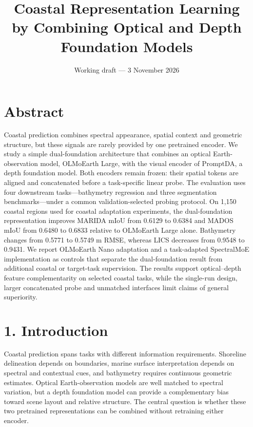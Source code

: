 \documentclass[
  10pt,
  english,
]{article}
\title{Coastal Representation Learning by Combining Optical and Depth
Foundation Models}
\author{}
\date{Working draft --- 3 November 2026}
\begin{document}
\maketitle

\hypertarget{abstract}{%
\section{Abstract}\label{abstract}}

Coastal prediction combines spectral appearance, spatial context and
geometric structure, but these signals are rarely provided by one
pretrained encoder. We study a simple dual-foundation architecture that
combines an optical Earth-observation model, OLMoEarth Large, with the
visual encoder of PromptDA, a depth foundation model. Both encoders
remain frozen: their spatial tokens are aligned and concatenated before
a task-specific linear probe. The evaluation uses four downstream
tasks---bathymetry regression and three segmentation benchmarks---under
a common validation-selected probing protocol. On 1,150 coastal regions
used for coastal adaptation experiments, the dual-foundation
representation improves MARIDA mIoU from 0.6129 to 0.6384 and MADOS mIoU
from 0.6480 to 0.6833 relative to OLMoEarth Large alone. Bathymetry
changes from 0.5771 to 0.5749 m RMSE, whereas LICS decreases from 0.9548
to 0.9431. We report OLMoEarth Nano adaptation and a task-adapted
SpectralMoE implementation as controls that separate the dual-foundation
result from additional coastal or target-task supervision. The results
support optical--depth feature complementarity on selected coastal
tasks, while the single-run design, larger concatenated probe and
unmatched interfaces limit claims of general superiority.

\hypertarget{introduction}{%
\section{1. Introduction}\label{introduction}}

Coastal prediction spans tasks with different information requirements.
Shoreline delineation depends on boundaries, marine surface
interpretation depends on spectral and contextual cues, and bathymetry
requires continuous geometric estimates. Optical Earth-observation
models are well matched to spectral variation, but a depth foundation
model can provide a complementary bias toward scene layout and relative
structure. The central question is whether these two pretrained
representations can be combined without retraining either encoder.
\end{document}
